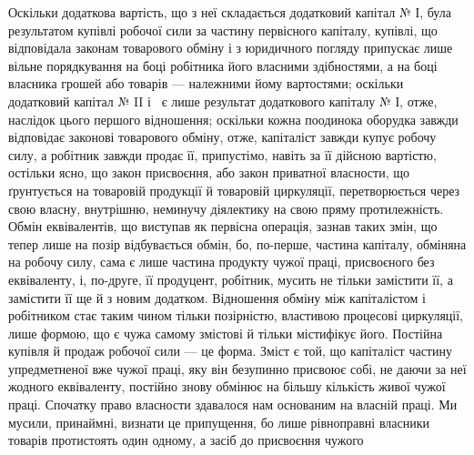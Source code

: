 Оскільки додаткова вартість, що з неї складається додатковий
капітал № І, була результатом купівлі робочої сили за частину
первісного капіталу, купівлі, що відповідала законам товарового
обміну і з юридичного погляду припускає лише вільне порядкування
на боці робітника його власними здібностями, а на боці
власника грошей або товарів — належними йому вартостями;
оскільки додатковий капітал № II і~ є лише результат додаткового
капіталу № І, отже, наслідок цього першого відношення;
оскільки кожна поодинока оборудка завжди відповідає
законові товарового обміну, отже, капіталіст завжди купує
робочу силу, а робітник завжди продає її, припустімо, навіть
за її дійсною вартістю, остільки ясно, що закон присвоєння, або
закон приватної власности, що ґрунтується на товаровій продукції
й товаровій циркуляції, перетворюється через свою власну,
внутрішню, неминучу діялектику на свою пряму протилежність.
Обмін еквівалентів, що виступав як первісна операція, зазнав
таких змін, що тепер лише на позір відбувається обмін, бо, по-перше,
частина капіталу, обміняна на робочу силу, сама є лише
частина продукту чужої праці, присвоєного без еквіваленту, і,
по-друге, її продуцент, робітник, мусить не тільки замістити її,
а замістити її ще й з новим додатком. Відношення обміну між
капіталістом і робітником стає таким чином тільки позірністю,
властивою процесові циркуляції, лише формою, що є чужа самому
змістові й тільки містифікує його. Постійна купівля й продаж
робочої сили — це форма. Зміст є той, що капіталіст частину
упредметненої вже чужої праці, яку він безупинно присвоює
собі, не даючи за неї жодного еквіваленту, постійно знову обмінює
на більшу кількість живої чужої праці. Спочатку право
власности здавалося нам основаним на власній праці. Ми мусили,
принаймні, визнати це припущення, бо лише рівноправні власники
товарів протистоять один одному, а засіб до присвоєння чужого
\parbreak{}  %
